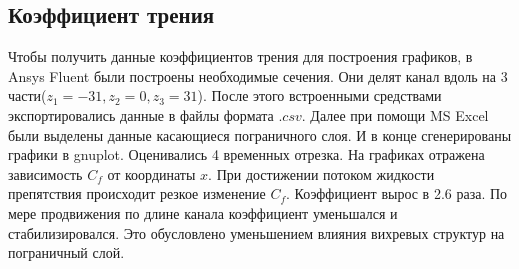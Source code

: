 \subsection{Коэффициент трения}
	Чтобы получить данные коэффициентов трения для построения графиков, в Ansys Fluent были построены необходимые сечения. Они делят канал вдоль на 3 части($z_1 = -31, z_2 = 0, z_3 = 31$). После этого встроенными средствами экспортировались данные в файлы формата $.csv$. Далее при помощи MS Excel были выделены данные касающиеся пограничного слоя. И в конце сгенерированы графики в gnuplot. 
	Оценивались 4 временных отрезка. На графиках отражена зависимость $C_f$ от координаты $x$. При достижении потоком жидкости препятствия происходит резкое изменение $C_f$. Коэффициент вырос в 2.6 раза. По мере продвижения по длине канала коэффициент уменьшался и стабилизировался. Это обусловлено уменьшением влияния вихревых структур на пограничный слой.
